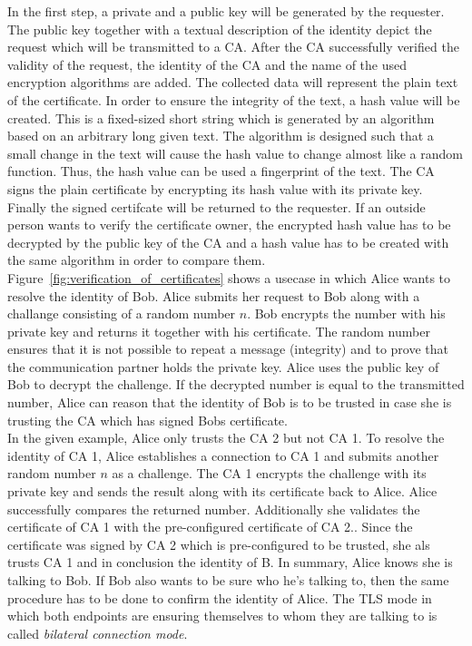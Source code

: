 In the first step, a private and a public key will be generated by the requester.
The public key together with a textual description of the identity depict the request which will be transmitted to a CA.
After the CA successfully verified the validity of the request, the identity of the CA and the name of the used encryption algorithms are added.
The collected data will represent the plain text of the certificate.
In order to ensure the integrity of the text, a hash value will be created.
This is a fixed-sized short string which is generated by an algorithm based on an arbitrary long given text.
The algorithm is designed such that a small change in the text will cause the hash value to change almost like a random function.
Thus, the hash value can be used a fingerprint of the text.
The CA signs the plain certificate by encrypting its hash value with its private key.
Finally the signed certifcate will be returned to the requester.
If an outside person wants to verify the certificate owner, the encrypted hash value has to be decrypted by the public key of the CA and a hash value has to be created with the same algorithm in order to compare them.\\


Figure~\ref{fig:verification_of_certificates} shows a usecase in which Alice wants to resolve the identity of Bob.
Alice submits her request to Bob along with a challange consisting of a random number $n$. 
Bob encrypts the number with his private key and returns it together with his certificate.
The random number ensures that it is not possible to repeat a message (integrity) and to prove that the communication partner holds the private key.
Alice uses the public key of Bob to decrypt the challenge. 
If the decrypted number is equal to the transmitted number, Alice can reason that the identity of Bob is to be trusted in case she is trusting the CA which has signed Bobs certificate.\\

In the given example, Alice only trusts the CA 2 but not CA 1.
To resolve the identity of CA 1, Alice establishes a connection to CA 1 and submits another random number $n$ as a challenge.
The CA 1 encrypts the challenge with its private key and sends the result along with its certificate back to Alice. 
Alice successfully compares the returned number. Additionally she validates the certificate of CA 1 with the pre-configured certificate of CA 2..
Since the certificate was signed by CA 2 which is pre-configured to be trusted, she als trusts CA 1 and in conclusion the identity of B.
In summary, Alice knows she is talking to Bob.
If Bob also wants to be sure who he's talking to, then the same procedure has to be done to confirm the identity of Alice.
The TLS mode in which both endpoints are ensuring themselves to whom they are talking to is called \textit{bilateral connection mode}.\\



